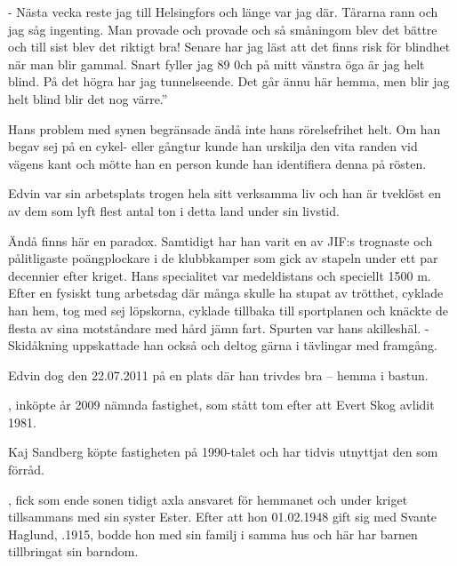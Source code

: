 - Nästa vecka reste jag till Helsingfors och länge var jag där. Tårarna rann och jag såg ingenting. Man provade och provade och så småningom blev det bättre och till sist blev det riktigt bra! Senare har jag läst att det finns risk för blindhet när man blir gammal. Snart fyller jag 89 0ch på mitt vänstra öga är jag helt blind. På det högra har jag tunnelseende. Det går ännu här hemma, men blir jag helt blind blir det nog värre.''

Hans problem med synen begränsade ändå inte hans rörelsefrihet helt. Om han begav sej på en cykel- eller gångtur kunde han urskilja den vita randen vid vägens kant och mötte han en person kunde han identifiera denna på rösten.

Edvin var sin arbetsplats trogen hela sitt verksamma liv och han är tveklöst en av dem som lyft flest antal ton i detta land under sin livstid.

Ändå finns här en paradox. Samtidigt har han varit en av JIF:s trognaste och pålitligaste poängplockare i de klubbkamper som gick av stapeln under ett par decennier efter kriget. Hans specialitet var medeldistans och speciellt 1500 m. Efter en fysiskt tung arbetsdag där många skulle ha stupat av trötthet, cyklade han hem, tog med sej löpskorna, cyklade tillbaka till sportplanen och knäckte de flesta av sina motståndare med  hård jämn fart. Spurten var hans akilleshäl. - Skidåkning uppskattade han också och deltog gärna i tävlingar med framgång.

Edvin dog den 22.07.2011 på en plats där han trivdes bra – hemma i bastun.



, inköpte år 2009 nämnda fastighet, som stått tom efter att Evert Skog avlidit 1981.


Kaj Sandberg köpte fastigheten på 1990-talet och har tidvis utnyttjat den som förråd.



, fick som ende sonen tidigt axla ansvaret för hemmanet och under kriget tillsammans med sin syster Ester. Efter att hon 01.02.1948 gift sig med Svante Haglund, .1915, bodde hon med sin familj i samma hus och här har barnen tillbringat sin barndom.
\begin{jhchildren}
  \item {}
  \item {}
  \item {}
  \item {}
  \item {}
\end{jhchildren}

